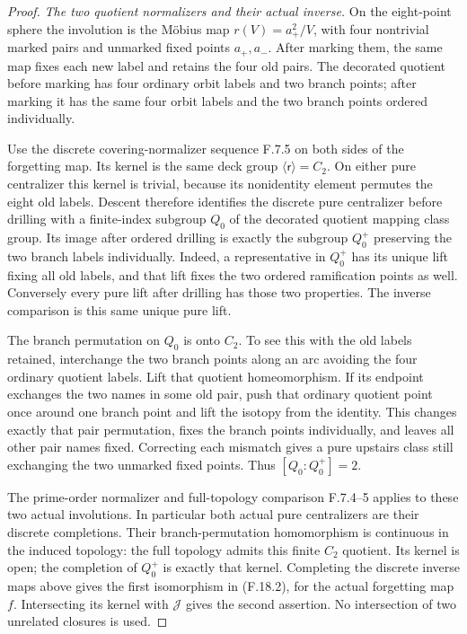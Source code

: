 \begin{proof}
\emph{The two quotient normalizers and their actual inverse.}
On the eight-point sphere the involution is the
M\"obius map $r(V)=a_+^2/V$, with four nontrivial
marked pairs and unmarked fixed points $a_+,a_-$.
After marking them, the same map fixes each new
label and retains the four old pairs.
The decorated quotient before marking has four
ordinary orbit labels and two branch points;
after marking it has the same four orbit labels
and the two branch points ordered individually.

Use the discrete covering-normalizer sequence F.7.5
on both sides of the forgetting map.
Its kernel is the same deck group
$\langle\mathsf r\rangle=C_2$.
On either pure centralizer this kernel is trivial,
because its nonidentity element permutes the eight
old labels.  Descent therefore identifies the
discrete pure centralizer before drilling with a
finite-index subgroup $Q_0$ of the decorated quotient
mapping class group.  Its image after ordered
drilling is exactly the subgroup $Q_0^+$ preserving
the two branch labels individually.
Indeed, a representative in $Q_0^+$ has its unique
lift fixing all old labels, and that lift fixes the
two ordered ramification points as well.
Conversely every pure lift after drilling has those
two properties.  The inverse comparison is this
same unique pure lift.

The branch permutation on $Q_0$ is onto $C_2$.
To see this with the old labels retained, interchange
the two branch points along an arc avoiding the
four ordinary quotient labels.
Lift that quotient homeomorphism.
If its endpoint exchanges the two names in some
old pair, push that ordinary quotient point once
around one branch point and lift the isotopy from
the identity.  This changes exactly that pair
permutation, fixes the branch points individually,
and leaves all other pair names fixed.
Correcting each mismatch gives a pure upstairs
class still exchanging the two unmarked fixed
points.  Thus $[Q_0:Q_0^+]=2$.

The prime-order normalizer and full-topology
comparison F.7.4--5 applies to these two actual
involutions.  In particular both actual pure
centralizers are their discrete completions.
Their branch-permutation homomorphism is continuous
in the induced topology: the full topology admits
this finite $C_2$ quotient.  Its kernel is open;
the completion of $Q_0^+$ is exactly that kernel.
Completing the discrete inverse maps above gives
the first isomorphism in (F.18.2), for the
actual forgetting map $f$.  Intersecting its
kernel with $\mathcal J$ gives the second assertion.
No intersection of two unrelated closures is used.


\end{proof}
